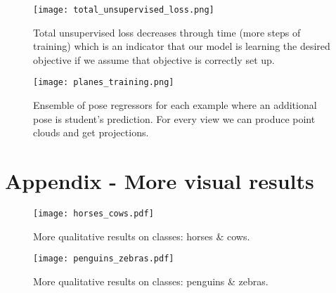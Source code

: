 \documentclass[runningheads]{llncs}
\begin{document}
\begin{figure*}[t!]
\centering
\texttt{[image: total\_unsupervised\_loss.png]}
\caption{Total unsupervised loss decreases through time (more steps of training) which is an indicator that our model is learning the desired objective if we assume that objective is correctly set up.} 
\label{fig:total_unsupervised_loss}
\end{figure*}

\begin{figure*}[hbt!]
\centering
\texttt{[image: planes\_training.png]}
\caption{Ensemble of pose regressors for each example where an additional pose is student's prediction. For every view we can produce point clouds and get projections.} 
\label{fig:planes_training}
\end{figure*}


\section{Appendix - More visual results}
\label{sec:more_visual_results}
\begin{figure*}[hbt!]
\centering
\setlength{\abovecaptionskip}{3pt}
 \texttt{[image: horses\_cows.pdf]}
 \caption{More qualitative results on classes: horses \& cows.} 
\label{fig:horses_cows}
\end{figure*}

\begin{figure*}[hbt!]
\centering
\setlength{\abovecaptionskip}{3pt}
 \texttt{[image: penguins\_zebras.pdf]}
 \caption{More qualitative results on classes: penguins \& zebras.} 
\label{fig:penguins_zebras}
\end{figure*}
\end{document}
